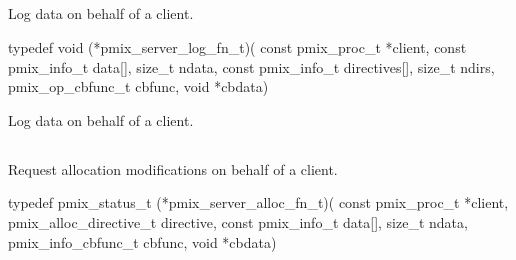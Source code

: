 \subsection{}

\summary

Log data on behalf of a client.

\format

\cspecificstart
\begin{codepar}
typedef void (*pmix_server_log_fn_t)(
                    const pmix_proc_t *client,
                    const pmix_info_t data[], size_t ndata,
                    const pmix_info_t directives[], size_t ndirs,
                    pmix_op_cbfunc_t cbfunc, void *cbdata)
\end{codepar}
\cspecificend

\begin{arglist}
\end{arglist}


\descr

Log data on behalf of a client.


\subsection{}

\summary

Request allocation modifications on behalf of a client.

\format

\cspecificstart
\begin{codepar}
typedef pmix_status_t (*pmix_server_alloc_fn_t)(
                             const pmix_proc_t *client,
                             pmix_alloc_directive_t directive,
                             const pmix_info_t data[], size_t ndata,
                             pmix_info_cbfunc_t cbfunc, void *cbdata)
\end{codepar}
\cspecificend

